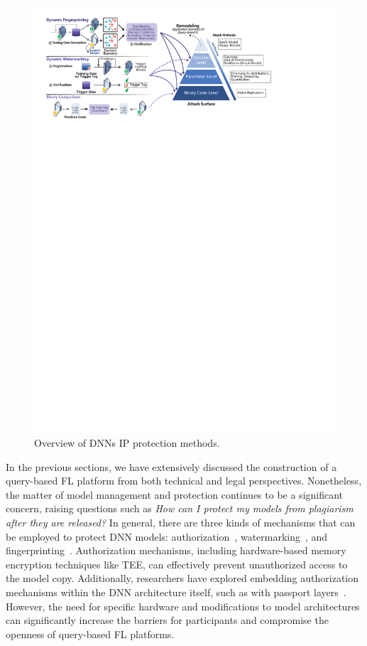 \begin{figure}[t]
  \centering
  \includegraphics[width=\linewidth]{fig/ip_protection.pdf}
  \caption{Overview of DNNs IP protection methods.}
  \Description{}
  \label{fig:ip}
\end{figure}

In the previous sections, we have extensively discussed the construction of a query-based FL platform from both technical and legal perspectives. 
Nonetheless, the matter of model management and protection continues to be a significant concern, raising questions such as \textit{How can I protect my models from plagiarism after they are released?}
In general, there are three kinds of mechanisms that can be employed to protect DNN models: authorization~\cite{hanzlik2021mlcapsule}, watermarking~\cite{tekgul2021waffle}, and fingerprinting~\cite{li2023fedipr}.
Authorization mechanisms, including hardware-based memory encryption techniques like TEE, can effectively prevent unauthorized access to the model copy.
Additionally, researchers have explored embedding authorization mechanisms within the DNN architecture itself, such as with passport layers~\cite{fan2019rethinking, zhang2020passport}.
However, the need for specific hardware and modifications to model architectures can significantly increase the barriers for participants and compromise the openness of query-based FL platforms.


